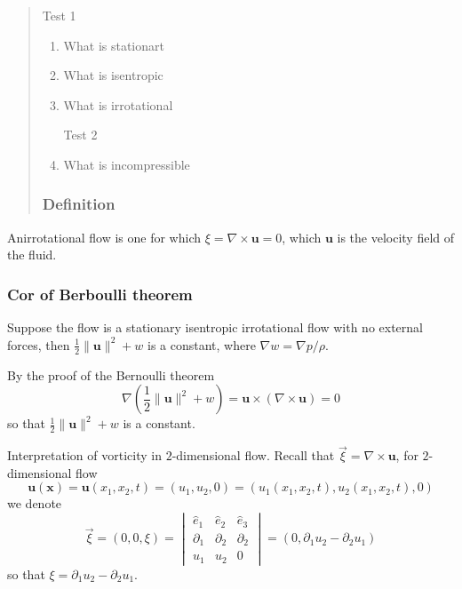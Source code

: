 \begin{quote}
	Test 1
\begin{enumerate}
	\item What is stationart
	\item What is isentropic
	\item What is irrotational

Test 2
	\item What is incompressible

\end{enumerate}
\subsubsection{Definition} %

\end{quote}
Anirrotational flow is one for which $\xi = \nabla\times\textbf{u} = 0$, which $\textbf{u}$ is the velocity field of the fluid.

\subsubsection{Cor of Berboulli theorem} %

Suppose the flow is a stationary isentropic irrotational flow with no external forces, then $\displaystyle \frac{1}{2} \lVert \textbf{u}\rVert^2 + w$ is a constant, where $\nabla w = \nabla p/\rho$.


By the proof of the Bernoulli theorem
\begin{equation}
\nabla \left(\frac{1}{2}\lVert \textbf{u}\rVert^2 + w\right) = \textbf{u}\times \left(\nabla\times \textbf{u}\right) = 0
\end{equation}
so that $\displaystyle \frac{1}{2} \lVert \textbf{u}\rVert^2 + w$ is a constant.




Interpretation of vorticity in $2$-dimensional flow. Recall that $\vec{\xi} = \nabla \times \textbf{u}$, for $2$-dimensional flow 
\begin{equation}
\textbf{u}(\textbf{x}) = \textbf{u}(x_1, x_2, t) = (u_1, u_2, 0)
= (u_1(x_1,x_2,t), u_2(x_1,x_2,t), 0)
\end{equation}
we denote
\begin{equation}
\vec{\xi} = (0,0,\xi) =
\begin{vmatrix}
\hat{e}_1 & \hat{e}_2 & \hat{e}_3\\
\partial_1 & \partial_2 & \partial_2\\
u_1 & u_2 & 0
\end{vmatrix}
= (0,\partial_1 u_2- \partial_2 u_1)
\end{equation}
so that $\xi = \partial_1 u_2- \partial_2 u_1$.

